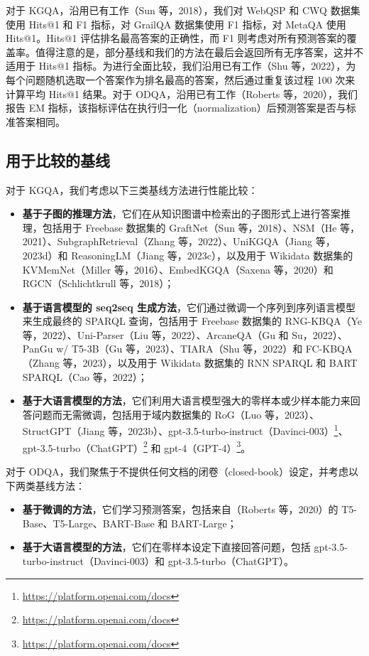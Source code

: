 \documentclass[11pt,UTF8,fontset=fandol]{ctexart}
\begin{document}
对于 KGQA，沿用已有工作（Sun 等，2018），我们对 WebQSP 和 CWQ 数据集使用 Hits@1 和 F1 指标，对 GrailQA 数据集使用 F1 指标，对 MetaQA 使用 Hits@1。Hits@1 评估排名最高答案的正确性，而 F1 则考虑对所有预测答案的覆盖率。值得注意的是，部分基线和我们的方法在最后会返回所有无序答案，这并不适用于 Hits@1 指标。为进行全面比较，我们沿用已有工作（Shu 等，2022），为每个问题随机选取一个答案作为排名最高的答案，然后通过重复该过程 100 次来计算平均 Hits@1 结果。对于 ODQA，沿用已有工作（Roberts 等，2020），我们报告 EM 指标，该指标评估在执行归一化（normalization）后预测答案是否与标准答案相同。

\subsection{用于比较的基线}

对于 KGQA，我们考虑以下三类基线方法进行性能比较：
\begin{itemize}[leftmargin=1.5em]
\item \textbf{基于子图的推理方法}，它们在从知识图谱中检索出的子图形式上进行答案推理，包括用于 Freebase 数据集的 GraftNet（Sun 等，2018）、NSM（He 等，2021）、SubgraphRetrieval（Zhang 等，2022）、UniKGQA（Jiang 等，2023d）和 ReasoningLM（Jiang 等，2023c），以及用于 Wikidata 数据集的 KVMemNet（Miller 等，2016）、EmbedKGQA（Saxena 等，2020）和 RGCN（Schlichtkrull 等，2018）；

\item \textbf{基于语言模型的 seq2seq 生成方法}，它们通过微调一个序列到序列语言模型来生成最终的 SPARQL 查询，包括用于 Freebase 数据集的 RNG-KBQA（Ye 等，2022）、Uni-Parser（Liu 等，2022）、ArcaneQA（Gu 和 Su，2022）、PanGu w/ T5-3B（Gu 等，2023）、TIARA（Shu 等，2022）和 FC-KBQA（Zhang 等，2023），以及用于 Wikidata 数据集的 RNN SPARQL 和 BART SPARQL（Cao 等，2022）；

\item \textbf{基于大语言模型的方法}，它们利用大语言模型强大的零样本或少样本能力来回答问题而无需微调，包括用于域内数据集的 RoG（Luo 等，2023）、StructGPT（Jiang 等，2023b）、gpt-3.5-turbo-instruct（Davinci-003）\footnote{\url{https://platform.openai.com/docs}}、gpt-3.5-turbo（ChatGPT）\footnote{\url{https://platform.openai.com/docs}} 和 gpt-4（GPT-4）\footnote{\url{https://platform.openai.com/docs}}。
\end{itemize}

对于 ODQA，我们聚焦于不提供任何文档的闭卷（closed-book）设定，并考虑以下两类基线方法：
\begin{itemize}[leftmargin=1.5em]
\item \textbf{基于微调的方法}，它们学习预测答案，包括来自（Roberts 等，2020）的 T5-Base、T5-Large、BART-Base 和 BART-Large；

\item \textbf{基于大语言模型的方法}，它们在零样本设定下直接回答问题，包括 gpt-3.5-turbo-instruct（Davinci-003）和 gpt-3.5-turbo（ChatGPT）。
\end{itemize}
\end{document}
